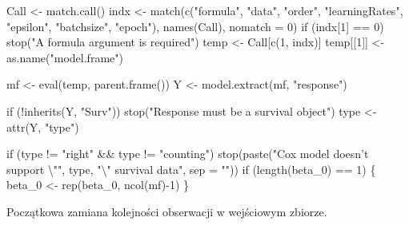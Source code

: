\documentclass[]{article}
\newenvironment{Shaded}{}{}
\newcommand{\KeywordTok}[1]{\textcolor[rgb]{0.00,0.00,1.00}{{#1}}}
\newcommand{\DataTypeTok}[1]{{#1}}
\newcommand{\DecValTok}[1]{{#1}}
\newcommand{\CharTok}[1]{\textcolor[rgb]{0.00,0.50,0.50}{{#1}}}
\newcommand{\StringTok}[1]{\textcolor[rgb]{0.00,0.50,0.50}{{#1}}}
\newcommand{\NormalTok}[1]{{#1}}
\begin{document}
\begin{Shaded}
\begin{Highlighting}[]
  \NormalTok{Call <-}\StringTok{ }\KeywordTok{match.call}\NormalTok{()}
  \NormalTok{indx <-}\StringTok{ }\KeywordTok{match}\NormalTok{(}\KeywordTok{c}\NormalTok{(}\StringTok{"formula"}\NormalTok{, }\StringTok{"data"}\NormalTok{, }\StringTok{"order"}\NormalTok{, }\StringTok{"learningRates"}\NormalTok{,}
                  \StringTok{"epsilon"}\NormalTok{, }\StringTok{"batchsize"}\NormalTok{, }\StringTok{"epoch"}\NormalTok{),}
                \KeywordTok{names}\NormalTok{(Call), }\DataTypeTok{nomatch =} \DecValTok{0}\NormalTok{)}
  \NormalTok{if (indx[}\DecValTok{1}\NormalTok{] ==}\StringTok{ }\DecValTok{0}\NormalTok{) }
      \KeywordTok{stop}\NormalTok{(}\StringTok{"A formula argument is required"}\NormalTok{)}
  \NormalTok{temp <-}\StringTok{ }\NormalTok{Call[}\KeywordTok{c}\NormalTok{(}\DecValTok{1}\NormalTok{, indx)]}
  \NormalTok{temp[[}\DecValTok{1}\NormalTok{]] <-}\StringTok{ }\KeywordTok{as.name}\NormalTok{(}\StringTok{"model.frame"}\NormalTok{)}
  
  \NormalTok{mf <-}\StringTok{ }\KeywordTok{eval}\NormalTok{(temp, }\KeywordTok{parent.frame}\NormalTok{())}
  \NormalTok{Y <-}\StringTok{ }\KeywordTok{model.extract}\NormalTok{(mf, }\StringTok{"response"}\NormalTok{)}
  
  \NormalTok{if (!}\KeywordTok{inherits}\NormalTok{(Y, }\StringTok{"Surv"}\NormalTok{)) }
      \KeywordTok{stop}\NormalTok{(}\StringTok{"Response must be a survival object"}\NormalTok{)}
  \NormalTok{type <-}\StringTok{ }\KeywordTok{attr}\NormalTok{(Y, }\StringTok{"type"}\NormalTok{)}
  
  \NormalTok{if (type !=}\StringTok{ "right"} \NormalTok{&&}\StringTok{ }\NormalTok{type !=}\StringTok{ "counting"}\NormalTok{) }
      \KeywordTok{stop}\NormalTok{(}\KeywordTok{paste}\NormalTok{(}\StringTok{"Cox model doesn't support }\CharTok{\textbackslash{}"}\StringTok{"}\NormalTok{, type, }\StringTok{"}\CharTok{\textbackslash{}"}\StringTok{ survival data"}\NormalTok{, }
          \DataTypeTok{sep =} \StringTok{""}\NormalTok{))}
  \NormalTok{if (}\KeywordTok{length}\NormalTok{(beta_0) ==}\StringTok{ }\DecValTok{1}\NormalTok{) \{}
    \NormalTok{beta_0 <-}\StringTok{ }\KeywordTok{rep}\NormalTok{(beta_0, }\KeywordTok{ncol}\NormalTok{(mf)-}\DecValTok{1}\NormalTok{)}
  \NormalTok{\}}
\end{Highlighting}
\end{Shaded}

Początkowa zamiana kolejności obserwacji w wejściowym zbiorze.
\end{document}
